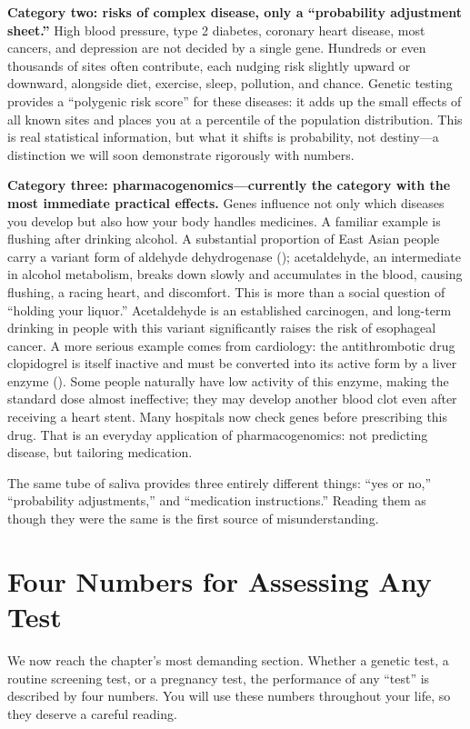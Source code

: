 \textbf{Category two: risks of complex disease, only a ``probability adjustment sheet.''} High blood pressure, type 2 diabetes, coronary heart disease, most cancers, and depression are not decided by a single gene. Hundreds or even thousands of sites often contribute, each nudging risk slightly upward or downward, alongside diet, exercise, sleep, pollution, and chance. Genetic testing provides a ``polygenic risk score'' for these diseases: it adds up the small effects of all known sites and places you at a percentile of the population distribution. This is real statistical information, but what it shifts is probability, not destiny---a distinction we will soon demonstrate rigorously with numbers.

\textbf{Category three: pharmacogenomics---currently the category with the most immediate practical effects.} Genes influence not only which diseases you develop but also how your body handles medicines. A familiar example is flushing after drinking alcohol. A substantial proportion of East Asian people carry a variant form of aldehyde dehydrogenase (); acetaldehyde, an intermediate in alcohol metabolism, breaks down slowly and accumulates in the blood, causing flushing, a racing heart, and discomfort. This is more than a social question of ``holding your liquor.'' Acetaldehyde is an established carcinogen, and long-term drinking in people with this variant significantly raises the risk of esophageal cancer. A more serious example comes from cardiology: the antithrombotic drug clopidogrel is itself inactive and must be converted into its active form by a liver enzyme (). Some people naturally have low activity of this enzyme, making the standard dose almost ineffective; they may develop another blood clot even after receiving a heart stent. Many hospitals now check genes before prescribing this drug. That is an everyday application of pharmacogenomics: not predicting disease, but tailoring medication.

The same tube of saliva provides three entirely different things: ``yes or no,'' ``probability adjustments,'' and ``medication instructions.'' Reading them as though they were the same is the first source of misunderstanding.

\section{Four Numbers for Assessing Any Test}

We now reach the chapter's most demanding section. Whether a genetic test, a routine screening test, or a pregnancy test, the performance of any ``test'' is described by four numbers. You will use these numbers throughout your life, so they deserve a careful reading.

